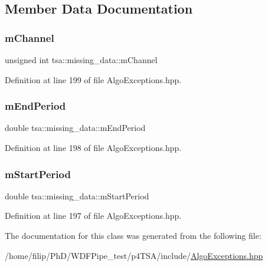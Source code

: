 \subsection{Member Data Documentation}
\mbox{\label{classtsa_1_1missing__data_ac223001a840eeb59c73cb0cef2483ed2}} 
\subsubsection{\texorpdfstring{m\+Channel}{mChannel}}
{\footnotesize\ttfamily unsigned int tsa\+::missing\+\_\+data\+::m\+Channel\hspace{0.3cm}{\ttfamily [private]}}



Definition at line 199 of file Algo\+Exceptions.\+hpp.

\mbox{\label{classtsa_1_1missing__data_ae4ac26763b09836066dd3202f421a2cc}} 
\subsubsection{\texorpdfstring{m\+End\+Period}{mEndPeriod}}
{\footnotesize\ttfamily double tsa\+::missing\+\_\+data\+::m\+End\+Period\hspace{0.3cm}{\ttfamily [private]}}



Definition at line 198 of file Algo\+Exceptions.\+hpp.

\mbox{\label{classtsa_1_1missing__data_a3bb2ac2dd0703730e7f0b29037bf65aa}} 
\subsubsection{\texorpdfstring{m\+Start\+Period}{mStartPeriod}}
{\footnotesize\ttfamily double tsa\+::missing\+\_\+data\+::m\+Start\+Period\hspace{0.3cm}{\ttfamily [private]}}



Definition at line 197 of file Algo\+Exceptions.\+hpp.



The documentation for this class was generated from the following file\+:\begin{DoxyCompactItemize}
\item 
/home/filip/\+Ph\+D/\+W\+D\+F\+Pipe\+\_\+test/p4\+T\+S\+A/include/\hyperlink{_algo_exceptions_8hpp}{Algo\+Exceptions.\+hpp}\end{DoxyCompactItemize}
